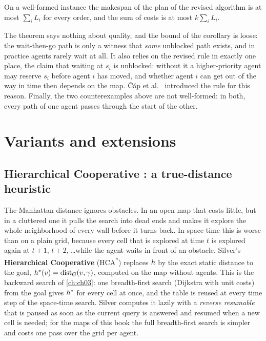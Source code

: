 \begin{corollary}
\label{thm:ch08-makespan}
On a well-formed instance the makespan of the plan of the revised algorithm is at most
$\sum_i L_i$ for every order, and the sum of costs is at most $k \sum_i L_i$.
\end{corollary}

\begin{remark}
The theorem says nothing about quality, and the bound of the corollary is loose: the
wait-then-go path is only a witness that \emph{some} unblocked path exists, and in
practice agents rarely wait at all. It also relies on the revised rule in exactly one
place, the claim that waiting at $s_i$ is unblocked: without it a higher-priority agent
may reserve $s_i$ before agent $i$ has moved, and whether agent $i$ can get out of the
way in time then depends on the map. \v{C}\'ap et al.~\cite{cap2015prioritized}
introduced the rule for this reason. Finally, the two counterexamples above are not
well-formed: in both, every path of one agent passes through the start of the other.
\end{remark}

\section{Variants and extensions}
\label{sec:ch08-variants}

\subsection{Hierarchical Cooperative \astar: a true-distance heuristic}
\label{sec:ch08-hca}

The Manhattan distance ignores obstacles. In an open map that costs little, but in a
cluttered one it pulls the search into dead ends and makes it explore the whole
neighborhood of every wall before it turns back. In space-time this is worse than on
a plain grid, because every cell that is explored at time $t$ is explored again at
$t + 1$, $t + 2$, \dots while the agent waits in front of an obstacle. Silver's
\textbf{Hierarchical Cooperative \astar} (HCA\textsuperscript{*})
replaces $h$ by the exact static distance to the goal, $h^*(v) =
\operatorname{dist}_G(v, \gamma)$, computed on the map without agents. This is the backward search of
\cref{ch:ch03}: one breadth-first search (Dijkstra with unit costs) from the goal gives
$h^*$ for every cell at once, and the table is reused at every time step of the
space-time search. Silver computes it lazily with a \emph{reverse resumable}
\astar{} that is paused as soon as the current query is
answered and resumed when a new cell is needed; for the maps of this book the full
breadth-first search is simpler and costs one pass over the grid per agent.


